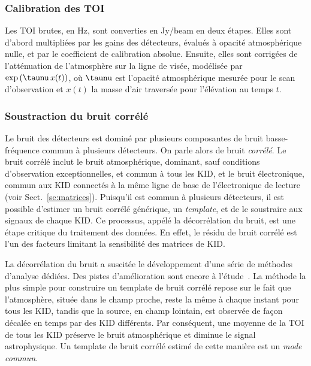\subsubsection{Calibration des TOI} Les TOI brutes, en Hz, sont converties en
Jy/beam en deux étapes. Elles sont d'abord multipliées par les gains
des détecteurs, évalués à opacité atmosphérique nulle, et par le
coefficient de calibration absolue. Ensuite, elles sont corrigées de
l'atténuation de l'atmosphère sur la ligne de visée, modélisée par
$\exp{\left( \taunu \, x(t)\right)}$, où $\taunu$ est l'opacité atmosphérique
mesurée pour le scan d'observation et $x(t)$ la masse d'air
traversée pour l'élévation au temps $t$.

\subsubsection{Soustraction du bruit corrélé}
Le bruit des détecteurs est dominé par plusieurs composantes de bruit
basse-fréquence commun à plusieurs détecteurs. On parle alors de bruit
\emph{corrélé}. Le bruit corrélé inclut le bruit atmosphérique,
dominant, sauf conditions d'observation exceptionnelles, et commun à
tous les KID, et le bruit électronique, commun aux KID connectés à la
même ligne de base de l'électronique de lecture (voir
Sect.~\ref{se:matrices}). Puisqu'il est commun à plusieurs détecteurs,
il est possible d'estimer un bruit corrélé générique, un
\emph{template}, et de le soustraire aux signaux de chaque KID. Ce
processus, appélé la décorrélation du bruit, est une étape critique du
traitement des données. En effet, le résidu de bruit corrélé est l'un
des facteurs limitant la sensibilité des matrices de KID.

La décorrélation du bruit a suscitée le développement d'une série de
méthodes d'analyse dédiées. Des pistes d'amélioration sont encore à
l'étude~\citep{Ponthieu2020}. La méthode la plus simple pour construire
un template de bruit corrélé repose sur le fait que l'atmosphère,
située dans le champ proche, reste la même à chaque instant pour tous
les KID, tandis que la source, en champ lointain, est observée de
façon décalée en temps par des KID différents. Par conséquent, une
moyenne de la TOI de tous les KID préserve le bruit atmosphérique et
diminue le signal astrophysique. Un template de bruit corrélé estimé
de cette manière est un \emph{mode commun}.

